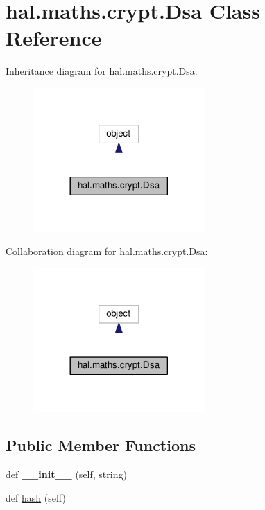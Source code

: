 \hypertarget{classhal_1_1maths_1_1crypt_1_1_dsa}{}\section{hal.\+maths.\+crypt.\+Dsa Class Reference}
\label{classhal_1_1maths_1_1crypt_1_1_dsa}


Inheritance diagram for hal.\+maths.\+crypt.\+Dsa\+:\nopagebreak
\begin{figure}[H]
\begin{center}
\leavevmode
\includegraphics[width=185pt]{classhal_1_1maths_1_1crypt_1_1_dsa__inherit__graph}
\end{center}
\end{figure}


Collaboration diagram for hal.\+maths.\+crypt.\+Dsa\+:\nopagebreak
\begin{figure}[H]
\begin{center}
\leavevmode
\includegraphics[width=185pt]{classhal_1_1maths_1_1crypt_1_1_dsa__coll__graph}
\end{center}
\end{figure}
\subsection*{Public Member Functions}
\begin{DoxyCompactItemize}
\item 
def {\bfseries \+\_\+\+\_\+init\+\_\+\+\_\+} (self, string)\hypertarget{classhal_1_1maths_1_1crypt_1_1_dsa_a127aadb2c49476c4ffc47537beb0a47f}{}\label{classhal_1_1maths_1_1crypt_1_1_dsa_a127aadb2c49476c4ffc47537beb0a47f}

\item 
def \hyperlink{classhal_1_1maths_1_1crypt_1_1_dsa_ab571cc724b6bd76e1001d9d449cb6c61}{hash} (self)
\end{DoxyCompactItemize}
